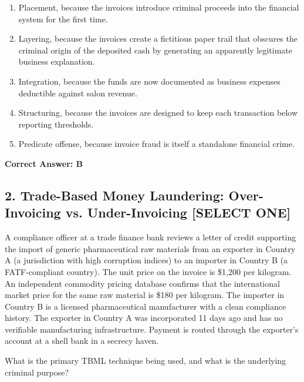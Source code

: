 \documentclass[11pt,a4paper]{article}
\begin{document}
	\begin{enumerate}[label=\Alph*.]
		\item Placement, because the invoices introduce criminal proceeds into the financial system for the first time.
		\item Layering, because the invoices create a fictitious paper trail that obscures the criminal origin of the deposited cash by generating an apparently legitimate business explanation.
		\item Integration, because the funds are now documented as business expenses deductible against salon revenue.
		\item Structuring, because the invoices are designed to keep each transaction below reporting thresholds.
		\item Predicate offense, because invoice fraud is itself a standalone financial crime.
	\end{enumerate}
	\textbf{Correct Answer: B}
	
	\subsection{2. Trade-Based Money Laundering: Over-Invoicing vs. Under-Invoicing \textnormal{[SELECT ONE]}}
	
	A compliance officer at a trade finance bank reviews a letter of credit supporting the import of generic pharmaceutical raw materials from an exporter in Country A (a jurisdiction with high corruption indices) to an importer in Country B (a FATF-compliant country). The unit price on the invoice is \$1,200 per kilogram. An independent commodity pricing database confirms that the international market price for the same raw material is \$180 per kilogram. The importer in Country B is a licensed pharmaceutical manufacturer with a clean compliance history. The exporter in Country A was incorporated 11 days ago and has no verifiable manufacturing infrastructure. Payment is routed through the exporter's account at a shell bank in a secrecy haven.
	
	What is the primary TBML technique being used, and what is the underlying criminal purpose?
	
\end{document}
